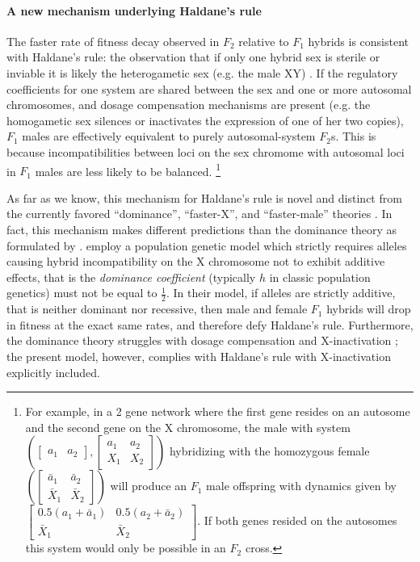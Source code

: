 \documentclass{article}
\newcommand{\1}{\mathbbm{1}}
\begin{document}
\paragraph{A new mechanism underlying Haldane's rule}
The faster rate of fitness decay observed in $F_2$ relative to $F_1$ hybrids is consistent with Haldane's rule: the observation that if only one hybrid sex is sterile or inviable it is likely the heterogametic sex (e.g. the male XY) \citep{haldane1922sex}.
If the regulatory coefficients for one system are shared between the sex and one or more autosomal chromosomes, and dosage compensation mechanisms are present (e.g. the homogametic sex silences or inactivates the expression of one of her two copies), $F_1$ males are effectively equivalent to purely autosomal-system $F_2$s. This is because incompatibilities between loci on the sex chromome with autosomal loci in $F_1$ males are less likely to be balanced.
\footnote{For example, in a 2 gene network where the first gene resides on an autosome and the second gene on the X chromosome, the male with system $\left( \left[ \begin{smallmatrix} a_1 & a_2 \end{smallmatrix} \right], \left[ \begin{smallmatrix} a_1 & a_2 \\ X_1 & X_2 \end{smallmatrix} \right] \right)$ hybridizing with the homozygous female $\left( \left[\begin{smallmatrix} \bar a_1 & \bar a_2 \\ \bar X_1 & \bar X_2 \end{smallmatrix}\right] \right)$ will produce an $F_1$ male offspring with dynamics given by $ \left[\begin{smallmatrix} 0.5(a_1 + \bar a_1) & 0.5(a_2 + \bar a_2) \\ \bar X_1 & \bar X_2 \end{smallmatrix}\right]$. If both genes resided on the autosomes this system would only be possible in an $F_2$ cross.}

As far as we know, this mechanism for Haldane's rule is novel and distinct from the currently favored ``dominance'', ``faster-X'', and ``faster-male'' theories \citep{orr1997haldane, coyne1998evolutionary}. In fact, this mechanism makes different predictions than the dominance theory as formulated by \citet{turelli1995dominance}. \citet{turelli1995dominance} employ a population genetic model which strictly requires alleles causing hybrid incompatibility on the X chromosome not to exhibit additive effects, that is the \emph{dominance coefficient} (typically $h$ in classic population genetics) must not be equal to $\frac{1}{2}$. In their model, if alleles are strictly additive, that is neither dominant nor recessive, then male and female $F_1$ hybrids will drop in fitness at the exact same rates, and therefore defy Haldane's rule. Furthermore, the dominance theory struggles with dosage compensation and X-inactivation \citep{watson2012haldane}; the present model, however, complies with Haldane's rule with X-inactivation explicitly included.
\end{document}
